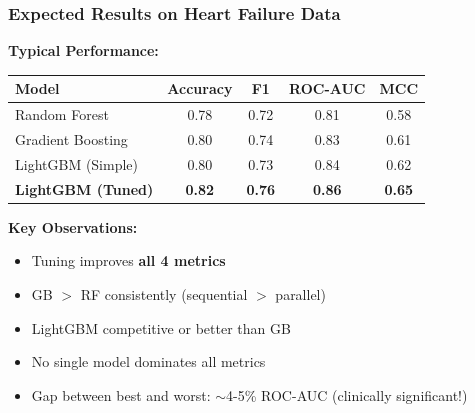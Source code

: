 \documentclass{beamer}
\begin{document}
\begin{frame}[fragile]
\frametitle{Expected Results on Heart Failure Data}

\textbf{Typical Performance:}

\begin{center}
{\small
\begin{tabular}{|l|c|c|c|c|}
\hline
\textbf{Model} & \textbf{Accuracy} & \textbf{F1} & \textbf{ROC-AUC} & \textbf{MCC} \\
\hline
Random Forest & 0.78 & 0.72 & 0.81 & 0.58 \\
\hline
Gradient Boosting & 0.80 & 0.74 & 0.83 & 0.61 \\
\hline
LightGBM (Simple) & 0.80 & 0.73 & 0.84 & 0.62 \\
\hline
\textbf{LightGBM (Tuned)} & \textbf{0.82} & \textbf{0.76} & \textbf{0.86} & \textbf{0.65} \\
\hline
\end{tabular}
}
\end{center}

\vspace{0.3cm}
\textbf{Key Observations:}

\begin{itemize}
    \item Tuning improves \textbf{all 4 metrics}
    \item GB $>$ RF consistently (sequential $>$ parallel)
    \item LightGBM competitive or better than GB
    \item No single model dominates all metrics
    \item Gap between best and worst: $\sim$4-5\% ROC-AUC (clinically significant!)
\end{itemize}

\end{frame}
\end{document}
